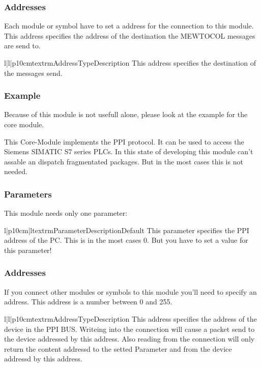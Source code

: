 \subsubsection{Addresses}
Each module or symbol have to set a address for the connection to this 
module. This address specifies the address of the destination the 
MEWTOCOL messages are send to. 
\begin{tableiii}{l|l|p{10cm}}{textrm}{Address}{Type}{Description}
        {}
        {This address specifies the destination of the messages send.}
\end{tableiii}

\subsubsection{Example}
Because of this module is not usefull alone, please look at the example for 
the  core module.



%
%
This Core-Module implements the PPI protocol. It can be used to access the Siemens
SIMATIC S7 series PLCs. In this state of developing this module can't assable an
dispatch fragmentated packages. But in the most cases this is not needed. 

\subsubsection{Parameters}
This module needs only one parameter:
\begin{tableiii}{l|p{10cm}|l}{textrm}{Parameter}{Description}{Default}
        {This parameter specifies the PPI address of the PC. This is in the 
         most cases 0. But you have to set a value for this parameter!}
        {}
\end{tableiii}

\subsubsection{Addresses}
If you connect other modules or symbols to this module you'll need to specify
an address. This address is a number between 0 and 255. 
\begin{tableiii}{l|l|p{10cm}}{textrm}{Address}{Type}{Description}
        {This address specifies the address of the device in the PPI BUS. 
         Writeing into the connection will cause a packet send to the device
         addressed by this address. Also reading from the connection will only
         return the content addressd to the setted Parameter  and
         from the device addressd by this address.}
\end{tableiii}

